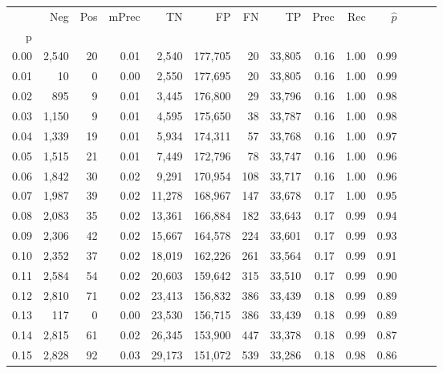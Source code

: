 \begin{tabular}{rrrrrrrrrrrrrr}
\toprule
{} &    Neg &  Pos & mPrec &       TN &       FP &      FN &      TP &  Prec &   Rec & $\hat{p}$ \\
p    &        &      &       &          &          &         &         &       &       &           \\
\midrule
0.00 &  2,540 &   20 &  0.01 &    2,540 &  177,705 &      20 &  33,805 &  0.16 &  1.00 &      0.99 \\
0.01 &     10 &    0 &  0.00 &    2,550 &  177,695 &      20 &  33,805 &  0.16 &  1.00 &      0.99 \\
0.02 &    895 &    9 &  0.01 &    3,445 &  176,800 &      29 &  33,796 &  0.16 &  1.00 &      0.98 \\
0.03 &  1,150 &    9 &  0.01 &    4,595 &  175,650 &      38 &  33,787 &  0.16 &  1.00 &      0.98 \\
0.04 &  1,339 &   19 &  0.01 &    5,934 &  174,311 &      57 &  33,768 &  0.16 &  1.00 &      0.97 \\
0.05 &  1,515 &   21 &  0.01 &    7,449 &  172,796 &      78 &  33,747 &  0.16 &  1.00 &      0.96 \\
0.06 &  1,842 &   30 &  0.02 &    9,291 &  170,954 &     108 &  33,717 &  0.16 &  1.00 &      0.96 \\
0.07 &  1,987 &   39 &  0.02 &   11,278 &  168,967 &     147 &  33,678 &  0.17 &  1.00 &      0.95 \\
0.08 &  2,083 &   35 &  0.02 &   13,361 &  166,884 &     182 &  33,643 &  0.17 &  0.99 &      0.94 \\
0.09 &  2,306 &   42 &  0.02 &   15,667 &  164,578 &     224 &  33,601 &  0.17 &  0.99 &      0.93 \\
0.10 &  2,352 &   37 &  0.02 &   18,019 &  162,226 &     261 &  33,564 &  0.17 &  0.99 &      0.91 \\
0.11 &  2,584 &   54 &  0.02 &   20,603 &  159,642 &     315 &  33,510 &  0.17 &  0.99 &      0.90 \\
0.12 &  2,810 &   71 &  0.02 &   23,413 &  156,832 &     386 &  33,439 &  0.18 &  0.99 &      0.89 \\
0.13 &    117 &    0 &  0.00 &   23,530 &  156,715 &     386 &  33,439 &  0.18 &  0.99 &      0.89 \\
0.14 &  2,815 &   61 &  0.02 &   26,345 &  153,900 &     447 &  33,378 &  0.18 &  0.99 &      0.87 \\
0.15 &  2,828 &   92 &  0.03 &   29,173 &  151,072 &     539 &  33,286 &  0.18 &  0.98 &      0.86 \\

\end{tabular}
